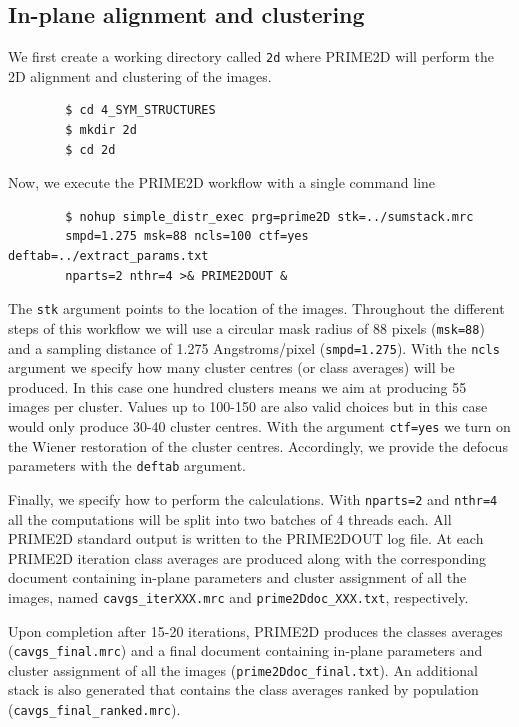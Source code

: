 \documentclass[a4paper,11pt]{article}
\begin{document}
\subsection{In-plane alignment and clustering}
We first create a working directory called \texttt{2d} where PRIME2D will perform the 2D alignment and clustering of the images.
\begin{verbatim}
        $ cd 4_SYM_STRUCTURES
        $ mkdir 2d
        $ cd 2d
\end{verbatim}
Now, we execute the PRIME2D workflow with a single command line
\begin{verbatim}
        $ nohup simple_distr_exec prg=prime2D stk=../sumstack.mrc 
        smpd=1.275 msk=88 ncls=100 ctf=yes deftab=../extract_params.txt 
        nparts=2 nthr=4 >& PRIME2DOUT &
\end{verbatim}
The \texttt{stk} argument points to the location of the images. Throughout the different steps of this workflow we will use a circular mask radius of 88 pixels (\texttt{msk=88}) and a sampling distance of 1.275 Angstroms/pixel (\texttt{smpd=1.275}). With the \texttt{ncls} argument we specify how many cluster centres (or class averages) will be produced. In this case one hundred clusters means we aim at producing 55 images per cluster. Values up to 100-150 are also valid choices but in this case would only produce 30-40 cluster centres. With the argument \texttt{ctf=yes} we turn on the Wiener restoration of the cluster centres. Accordingly, we provide the defocus parameters with the \texttt{deftab} argument.

Finally, we specify how to perform the calculations. With \texttt{nparts=2} and \texttt{nthr=4} all the computations will be split into two batches of 4 threads each. All PRIME2D standard output is written to the PRIME2DOUT log file. At each PRIME2D iteration class averages are produced along with the corresponding document containing in-plane parameters and cluster assignment of all the images, named \texttt{cavgs\_iterXXX.mrc} and \texttt{prime2Ddoc\_XXX.txt}, respectively.

Upon completion after 15-20 iterations, PRIME2D produces the classes averages (\texttt{cavgs\_final.mrc}) and a final document containing in-plane parameters and cluster assignment of all the images (\texttt{prime2Ddoc\_final.txt}). An additional stack is also generated that contains the class averages ranked by population (\texttt{cavgs\_final\_ranked.mrc}).
\end{document}
